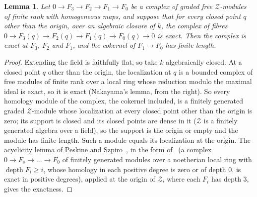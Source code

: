 \documentclass[11pt]{article}
\newtheorem{lemma}{Lemma}
\theoremstyle{definition}
\theoremstyle{remark}
\begin{document}
\begin{lemma}\label{lem:fibres}
Let $0\to F_3\to F_2\to F_1\to F_0$ be a complex of graded free $\mathcal Z$-modules of finite rank with homogeneous maps, and suppose that for every closed point $q$ other than the origin, over an algebraic closure of $k$, the complex of fibres $0\to F_3(q)\to F_2(q)\to F_1(q)\to F_0(q)\to0$ is exact. Then the complex is exact at $F_3$, $F_2$ and $F_1$, and the cokernel of $F_1\to F_0$ has finite length.
\end{lemma}
\begin{proof}
Extending the field is faithfully flat, so take $k$ algebraically closed. At a closed point $q$ other than the origin, the localization at $q$ is a bounded complex of free modules of finite rank over a local ring whose reduction modulo the maximal ideal is exact, so it is exact (Nakayama's lemma, from the right). So every homology module of the complex, the cokernel included, is a finitely generated graded $\mathcal Z$-module whose localization at every closed point other than the origin is zero; its support is closed and its closed points are dense in it ($\mathcal Z$ is a finitely generated algebra over a field), so the support is the origin or empty and the module has finite length. Such a module equals its localization at the origin. The acyclicity lemma of Peskine and Szpiro~\cite{PS73}, in the form of~\cite[Tag~00N0]{Stacks} (a complex $0\to F_s\to\dots\to F_0$ of finitely generated modules over a noetherian local ring with $\operatorname{depth}F_i\ge i$, whose homology in each positive degree is zero or of depth $0$, is exact in positive degrees), applied at the origin of $\mathcal Z$, where each $F_i$ has depth $3$, gives the exactness.
\end{proof}
\end{document}
